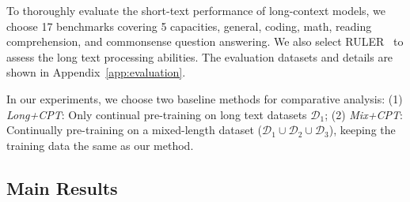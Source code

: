 

To thoroughly evaluate the short-text performance of long-context models, we choose 17 benchmarks covering 5 capacities, \ie general, coding, math, reading comprehension, and commonsense question answering. We also select RULER~\cite{Hsieh-arxiv-2024-RULER} to assess the long text processing abilities. The evaluation datasets and details are shown in Appendix~\ref{app:evaluation}.


In our experiments, we choose two baseline methods for comparative analysis: (1) \emph{Long+CPT}: Only continual pre-training on long text datasets $\mathcal D_1$;
(2) \emph{Mix+CPT}: Continually pre-training on a mixed-length dataset ($\mathcal{D}_1\cup \mathcal{D}_2\cup\mathcal{D}_3$),  keeping the training data the same as our method. 



\subsection{Main Results}


